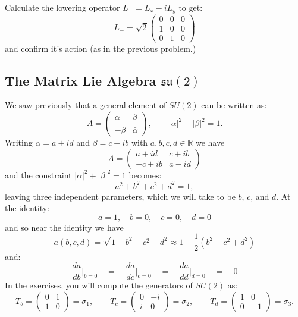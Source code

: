 \documentclass[12pt]{article}
\begin{document}
\exercise Calculate the lowering operator $L_- = L_x - i L_y$ to get:
$$
L_- = \sqrt{2}\begin{pmatrix} 0 & 0 & 0 \\ 1 & 0 & 0 \\ 0 & 1 & 0 \end{pmatrix}
$$
and confirm it's action (as in the previous problem.)

\subsection*{The Matrix Lie Algebra $\mathfrak{su}(2)$}

We saw previously that a general element of $SU(2)$ can be written
as:
\begin{equation*}
  A = \begin{pmatrix} \alpha & \beta \\ -\bar\beta & \bar\alpha \end{pmatrix}, \qquad |\alpha|^2 + |\beta|^2 = 1.
\end{equation*}
Writing $\alpha = a + id$ and $\beta = c + ib$ with $a,b,c,d \in \mathbb{R}$ we have
\begin{equation*}
  A = \begin{pmatrix} a+id & c+ib \\ -c+ib & a-id \end{pmatrix}
\end{equation*}
and the constraint $|\alpha|^2 + |\beta|^2 = 1$ becomes:
\begin{equation*}
  a^2 + b^2 + c^2 + d^2 = 1,
\end{equation*}
leaving three independent parameters, which we will take to be $b$, $c$, and $d$.  At the identity:
$$a=1, \quad b=0, \quad c=0, \quad d=0$$
and so near the identity we have
$$a(b,c,d) = \sqrt{1-b^2-c^2-d^2} \approx 1 - \frac{1}{2}(b^2 + c^2 + d^2)$$
and:
$$\frac{da}{db}\Big|_{b=0} \quad = \quad \frac{da}{dc}\Big|_{c=0}
\quad = \quad \frac{da}{dd}\Big|_{d=0} \quad = \quad 0$$
In the exercises, you will compute the generators of $SU(2)$ as:
\begin{equation*}
  T_b = \begin{pmatrix}0&1\\1&0\end{pmatrix} = \sigma_1, \qquad
  T_c = \begin{pmatrix}0&-i\\i&0\end{pmatrix} = \sigma_2, \qquad
  T_d = \begin{pmatrix}1&0\\0&-1\end{pmatrix} = \sigma_3.
\end{equation*}
\end{document}
